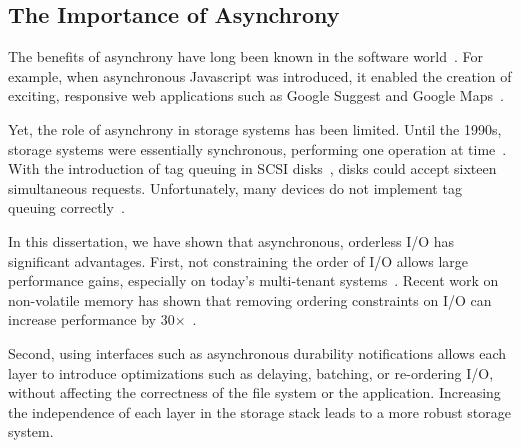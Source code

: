 \subsection{The Importance of Asynchrony}
\label{sec-conc-lessons-asynchrony}

The benefits of asynchrony have long been known in the software
world~\cite{michelson2006event, AdyaEtAl02-Tasks}. For example, when
asynchronous Javascript was introduced, it enabled the creation of
exciting, responsive web applications such as Google Suggest and Google
Maps~\cite{garrett2005ajax}.

Yet, the role of asynchrony in storage systems has been limited. Until
the 1990s, storage systems were essentially synchronous, performing
one operation at time~\cite{Seltzer90-SchedRevisit,
  McKusickEtAl-FFS-84}. With the introduction of tag queuing in SCSI
disks~\cite{AndersonEtAl03-SCSIvATA, RidgeField00-SCSI, Weber04-SCSI},
disks could accept sixteen simultaneous requests. Unfortunately, many
devices do not implement tag queuing
correctly~\cite{marshall2012disks}.

In this dissertation, we have shown that asynchronous, orderless I/O
has significant advantages. First, not constraining the order of I/O
allows large performance gains, especially on today's multi-tenant
systems~\cite{thereska2013ioflow}. Recent work on non-volatile memory
has shown that removing ordering constraints on I/O can increase
performance by 30$\times$~\cite{pelley2014memory}. 

Second, using interfaces such as asynchronous durability notifications
allows each layer to introduce optimizations such as delaying,
batching, or re-ordering I/O, without affecting the correctness of the
file system or the application. Increasing the independence of each
layer in the storage stack leads to a more robust storage system.
